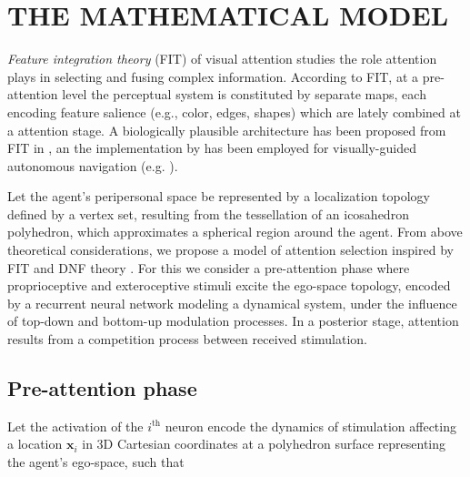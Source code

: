 \documentclass[letterpaper, 10 pt, conference]{ieeeconf}  %
\begin{document}

	
	\section{THE MATHEMATICAL MODEL}	
	\label{sec:model}
	
	\textit{Feature integration theory} (FIT) \cite{treisman1980} of visual attention studies the role attention plays in selecting and fusing complex information. According to FIT, at a pre-attention level the perceptual system is constituted by separate maps, each encoding feature salience (e.g., color, edges, shapes) which are lately combined at a attention stage. A biologically plausible architecture has been proposed from FIT in \cite{koch1985}, an the implementation by \cite{itti1998} has been employed for visually-guided autonomous navigation (e.g. \cite{siagian2014}).

	Let the agent's peripersonal space be represented by a localization topology defined by a vertex set, resulting from the tessellation of an icosahedron polyhedron, which approximates a spherical region around the agent. From above theoretical considerations, we propose a model of attention selection inspired by FIT and DNF theory \cite{amari1977}. For this we consider a pre-attention phase where proprioceptive and exteroceptive stimuli excite the ego-space topology, encoded by a recurrent neural network modeling a dynamical system, under the influence of top-down and bottom-up modulation processes. In a posterior stage, attention results from a competition process between received stimulation.
	
	\subsection{Pre-attention phase}
	Let the activation of the $i^\mathrm{th}$ neuron encode the dynamics of stimulation affecting a location  $\mathbf{x}_i$ in 3D Cartesian coordinates at a polyhedron surface representing the agent's ego-space, such that 
		
\end{document}
